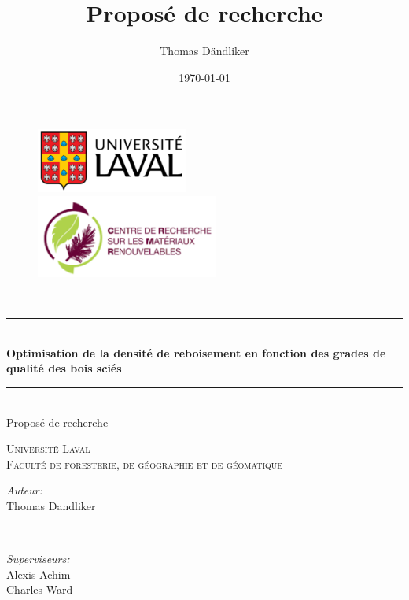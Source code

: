 \documentclass[letterpaper, 12pt]{article}
\title{Proposé de recherche}
\author{Thomas Dändliker}
\date{\today}
\begin{document}
\begin{titlepage}
	\newcommand{\HRule}{\rule{\linewidth}{0.2mm}}     
	
	\begin{figure}[t]
		\begin{minipage}{0.5\textwidth}\large
			\begin{flushleft}
				\includegraphics[width=5cm]{ULAVAL}
			\end{flushleft}
		\end{minipage}
		\begin{minipage}{0.5\textwidth}\large
			\begin{flushright}
				\includegraphics[width=6cm]{CRMR}
				
			\end{flushright}
		\end{minipage}
	\end{figure}
	\textsc{ \\[1cm]}
	
	\begin{center}
		\HRule 
		\\[0.5cm]
		{\Large    \textbf{Optimisation de la densité de reboisement en fonction des grades de qualité des bois sciés}}
		\HRule
		\\[0.5cm]
		{\large Proposé de recherche \\
		}
		
	\end{center}
	
	\vfill 
	\begin{center}
		
		\textsc{\large      
			Université Laval\\
			Faculté de foresterie, de géographie et de géomatique\\[3cm]}
	\end{center}

	
	\begin{minipage}{0.5\textwidth}
		\begin{flushleft} \large
			\emph{Auteur:}\\
			Thomas Dandliker 
		\end{flushleft}
	\end{minipage}
	~
	\begin{minipage}{0.5\textwidth}
		\begin{flushright}\large
			\emph{Superviseurs:} \\
			Alexis Achim \\
			Charles Ward \\
		\end{flushright}
	\end{minipage}
	

\end{titlepage}
\end{document}
